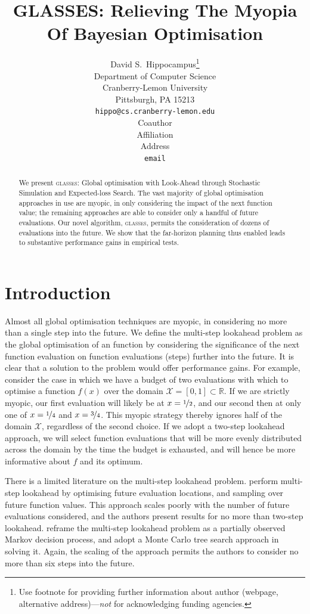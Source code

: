 \documentclass{article} %
\title{
    GLASSES: Relieving The Myopia Of Bayesian Optimisation
}
\author{
David S.~Hippocampus\thanks{ Use footnote for providing further information about author (webpage, alternative address)---\emph{not} for acknowledging funding agencies.} \\
Department of Computer Science\\
Cranberry-Lemon University\\
Pittsburgh, PA 15213 \\
\texttt{hippo@cs.cranberry-lemon.edu} \\
\And
Coauthor \\
Affiliation \\
Address \\
\texttt{email} \\
}
\newcommand{\reals}{\mathbb{R}}
\newcommand{\sX}{\mathcal{X}}
\newcommand{\acr}[1]{\textsc{#1}\xspace}
\newcommand{\us}{\acr{glasses}}
\begin{document}
\maketitle

\begin{abstract}
    We present \us: Global optimisation with Look-Ahead through Stochastic Simulation and Expected-loss Search. 
    The vast majority of global optimisation approaches in use are myopic, in only considering the impact of the next function value; the remaining approaches are able to consider only a handful of future evaluations. 
    Our novel algorithm, \us, permits the consideration of dozens of evaluations into the future. 
    We show that the far-horizon planning thus enabled leads to substantive performance gains in empirical tests. 
\end{abstract}

\section{Introduction} %
\label{sec:introduction}

Almost all global optimisation techniques are myopic, in considering no more than a single step into the future. 
We define the multi-step lookahead problem as the global optimisation of an function by considering the significance of the next function evaluation on function evaluations (steps) further into the future. 
It is clear that a solution to the problem would offer performance gains.
For example, consider the case in which we have a budget of two evaluations with which to optimise a function $f(x)$ over the domain $\sX = [0, 1] \subset \reals$. 
If we are strictly myopic, our first evaluation will likely be at 
$x=\nicefrac{1}{2}$, and our second then at only one of $x=\nicefrac{1}{4}$ and $x=\nicefrac{3}{4}$. 
This myopic strategy thereby ignores half of the domain $\sX$, regardless of the second choice. 
If we adopt a two-step lookahead approach, we will select function evaluations that will be more evenly distributed across the domain by the time the budget is exhausted, and will hence be more informative about $f$ and its optimum.

There is a limited literature on the multi-step lookahead problem.
\cite{osborne_gaussian_2009} perform multi-step lookahead by optimising future evaluation locations, and sampling over future function values. 
This approach scales poorly with the number of future evaluations considered, and the authors present results for no more than two-step lookahead.
\cite{Marchant*Ramos*Sanner*2014} reframe the multi-step lookahead problem as a partially observed Markov decision process, and adopt a Monte Carlo tree search approach in solving it. 
Again, the scaling of the approach permits the authors to consider no more than six steps into the future. 
\end{document}
